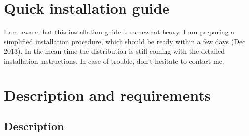 \documentclass[12pt,a4paper, oneside]{scrreprt} %
\begin{document}


\newpage
\tableofcontents
\newpage

\chapter{Quick installation guide}

I am aware that this installation guide is somewhat heavy. I am
preparing a simplified installation procedure, which should be ready
within a few days (Dec 2013). In the mean time the distribution is
still coming with the detailed installation instructions. In case of
trouble, don't hesitate to contact me.




    

\chapter{Description and requirements}

\section{Description}
\end{document}
